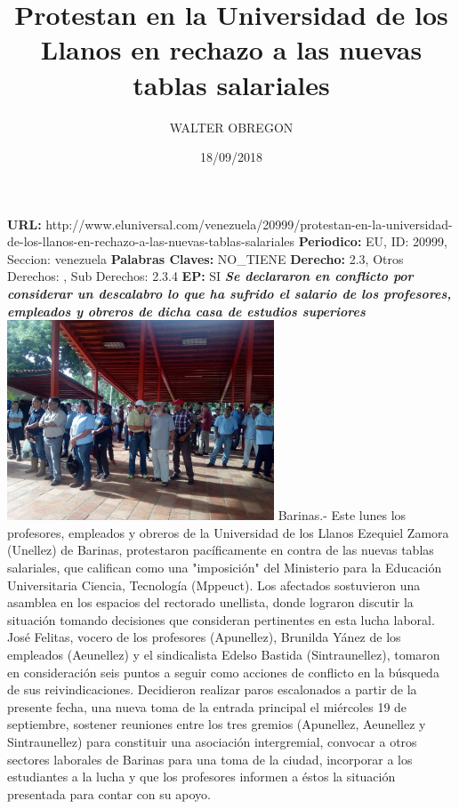 \documentclass{article}%
\title{\textbf{Protestan en la Universidad de los Llanos en rechazo a las nuevas tablas salariales}}%
\author{WALTER OBREGON}%
\date{18/09/2018}%
\begin{document}
%
\normalsize%
\maketitle%
\textbf{URL: }%
http://www.eluniversal.com/venezuela/20999/protestan{-}en{-}la{-}universidad{-}de{-}los{-}llanos{-}en{-}rechazo{-}a{-}las{-}nuevas{-}tablas{-}salariales\newline%
%
\textbf{Periodico: }%
EU, %
ID: %
20999, %
Seccion: %
venezuela\newline%
%
\textbf{Palabras Claves: }%
NO\_TIENE\newline%
%
\textbf{Derecho: }%
2.3, %
Otros Derechos: %
, %
Sub Derechos: %
2.3.4\newline%
%
\textbf{EP: }%
SI\newline%
\newline%
%
\textbf{\textit{Se declararon en conflicto por considerar un descalabro lo que ha sufrido el salario de los profesores, empleados y obreros de dicha casa de estudios superiores}}%
\newline%
\newline%
%
\includegraphics[width=300px]{171.jpg}%
\newline%
%
Barinas.{-} Este lunes los profesores, empleados y obreros de la Universidad de los Llanos Ezequiel Zamora (Unellez) de Barinas, protestaron pacíficamente en contra de las nuevas tablas salariales, que califican como una "imposición" del Ministerio para la Educación Universitaria Ciencia, Tecnología (Mppeuct).%
\newline%
%
Los afectados sostuvieron una asamblea en los espacios del rectorado unellista, donde lograron discutir la situación tomando decisiones que consideran pertinentes en esta lucha laboral.%
\newline%
%
José Felitas, vocero de los profesores (Apunellez), Brunilda Yánez de los empleados (Aeunellez) y el sindicalista Edelso Bastida (Sintraunellez), tomaron en consideración seis puntos a seguir como acciones de conflicto en la búsqueda de sus reivindicaciones.%
\newline%
%
Decidieron realizar paros escalonados a partir de la presente fecha, una nueva toma de la entrada principal el miércoles 19 de septiembre, sostener reuniones entre los tres gremios (Apunellez, Aeunellez y Sintraunellez) para constituir una asociación intergremial, convocar a otros sectores laborales de Barinas para una toma de la ciudad, incorporar a los estudiantes a la lucha y que los profesores informen a éstos la situación presentada para contar con su apoyo.%
\newline%
%
\end{document}
